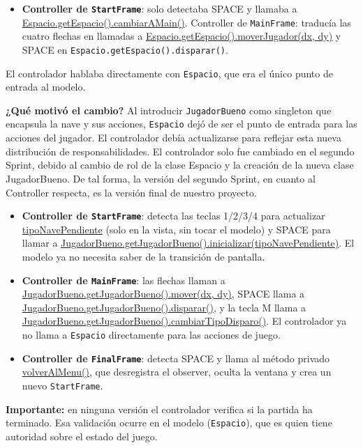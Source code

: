 \documentclass[12pt, a4paper]{article}
\begin{document}
\begin{cajasprint1}
\begin{itemize}
    \item \textbf{Controller de \texttt{StartFrame}}: solo detectaba SPACE y llamaba a
    \url{Espacio.getEspacio().cambiarAMain()}.
    Controller de \texttt{MainFrame}: traduc\'{i}a las cuatro flechas en llamadas a
    \url{Espacio.getEspacio().moverJugador(dx, dy)} y SPACE en
    \texttt{Espacio.getEspacio().disparar()}.
\end{itemize}
El controlador hablaba directamente con \texttt{Espacio}, que era el \'{u}nico punto de entrada al modelo.
\end{cajasprint1}
 
\vspace{0.5em}
\textbf{¿Qu\'{e} motiv\'{o} el cambio?} Al introducir \texttt{JugadorBueno} como singleton que encapsula la nave y sus acciones, \texttt{Espacio} dej\'{o} de ser el punto de entrada para las acciones del jugador. El controlador deb\'{i}a actualizarse para reflejar esta nueva distribuci\'{o}n de responsabilidades. El controlador solo fue cambiado en el segundo Sprint, debido al cambio de rol de la clase Espacio y la creación de la nueva clase JugadorBueno. De tal forma, la versión del segundo Sprint, en cuanto al Controller respecta, es la versión final de nuestro proyecto.
 
\vspace{0.5em}
 
\begin{cajafinal}
\begin{itemize}
    \item \textbf{Controller de \texttt{StartFrame}}: detecta las teclas 1/2/3/4 para actualizar \url{tipoNavePendiente} (solo en la vista, sin tocar el modelo) y SPACE para llamar a \url{JugadorBueno.getJugadorBueno().inicializar(tipoNavePendiente)}. El modelo ya no necesita saber de la transici\'{o}n de pantalla.
    \item \textbf{Controller de \texttt{MainFrame}}: las flechas llaman a \url{JugadorBueno.getJugadorBueno().mover(dx, dy)}, SPACE llama a \url{JugadorBueno.getJugadorBueno().disparar()}, y la tecla M llama a \url{JugadorBueno.getJugadorBueno().cambiarTipoDisparo()}. El controlador ya no llama a \texttt{Espacio} directamente para las acciones de juego.
    \item \textbf{Controller de \texttt{FinalFrame}}: detecta SPACE y llama al m\'{e}todo privado \url{volverAlMenu()}, que desregistra el observer, oculta la ventana y crea un nuevo \texttt{StartFrame}.
\end{itemize}
 
\textbf{Importante:} en ninguna versi\'{o}n el controlador verifica si la partida ha terminado. Esa validaci\'{o}n ocurre en el modelo (\texttt{Espacio}), que es quien tiene autoridad sobre el estado del juego.
\end{cajafinal}
 
\end{document}

